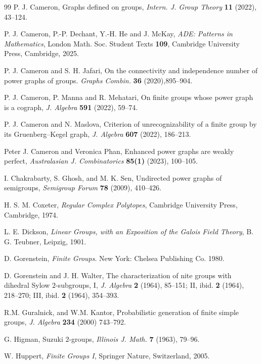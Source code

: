\documentclass[12pt]{amsart}
\theoremstyle{plain}
\theoremstyle{remark}
\theoremstyle{definition}
\begin{document}
\begin{thebibliography}{99}
P. J. Cameron,
Graphs defined on groups,
\textit{Intern. J. Group Theory} \textbf{11} (2022), 43--124.

P. J. Cameron, P.-P. Dechant, Y.-H. He and J. McKay,
\textit{ADE: Patterns in Mathematics},
London Math. Soc. Student Texts \textbf{109},
Cambridge University Press, Cambridge, 2025.

P. J. Cameron and S. H. Jafari, On the connectivity and independence number of power graphs of
 groups. \textit{Graphs Combin.} \textbf{36} (2020),895--904.

P. J. Cameron, P. Manna and R. Mehatari,
On finite groups whose power graph is a cograph,
\textit{J. Algebra} \textbf{591} (2022), 59--74.

P. J. Cameron and N. Maslova,
Criterion of unrecognizability of a finite group by its Gruenberg--Kegel graph,
\textit{J. Algebra} \textbf{607} (2022), 186--213.

Peter J. Cameron and Veronica Phan, Enhanced power graphs are weakly perfect,
\textit{Australasian J. Combinatorics} \textbf{85(1)} (2023), 100--105.

I. Chakrabarty, S. Ghosh, and M. K. Sen,
Undirected power graphs of semigroups,
\textit{Semigroup Forum} \textbf{78} (2009), 410--426.

H. S. M. Coxeter,
\textit{Regular  Complex  Polytopes},
Cambridge  University Press, Cambridge, 1974.

L. E. Dickson,
\textit{Linear Groups, with an Exposition of the Galois Field Theory},
B. G. Teubner, Leipzig, 1901.

D. Gorenstein, \textit{Finite Groups}. New York: Chelsea Publishing Co. 1980.

D. Gorenstein and J. H. Walter, 
The characterization of  nite groups with dihedral Sylow $2$-subgroups,
I, \textit{J. Algebra} \textbf{2} (1964), 85--151;
II, ibid. \textbf{2} (1964), 218--270;
III, ibid. \textbf{2} (1964), 354--393.

R.M. Guralnick, and W.M. Kantor, Probabilistic generation of finite simple groups, \textit{J. Algebra}  \textbf{234}
(2000) 743--792.

G. Higman,
Suzuki $2$-groups,
\textit{Illinois J. Math.} \textbf{7} (1963), 79--96.

W. Huppert,
\textit{Finite Groups I},
Springer Nature, Switzerland, 2005.


\end{thebibliography}
\end{document}
